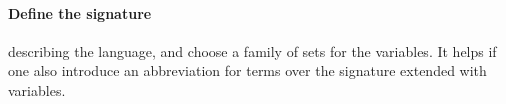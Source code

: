 \paragraph*{Define the signature}
\label{sec:define-signature} describing the language, and choose
  a family of sets for the variables. It helps if one also introduce
  an abbreviation for terms over the signature extended with
  variables.

  \begin{code}
    \>[0]\AgdaSpace{}%
\AgdaSpace{}%
\AgdaSymbol{:}\AgdaSpace{}%
\AgdaSpace{}%
\AgdaSpace{}%
\AgdaSpace{}%
\AgdaSpace{}%
\AgdaSpace{}%
\AgdaSpace{}%
\<%
\\
\>[0][@{}l@{\AgdaIndent{0}}]%
\>[2] %
\>[7]\AgdaSymbol{:}\AgdaSpace{}%
\AgdaSpace{}%
\AgdaSymbol{(}\AgdaInductiveConstructor{[]}\AgdaSpace{}%
\AgdaSpace{}%
\AgdaSymbol{)}\<%
\\
%
\>[2]\AgdaSpace{}%
\AgdaSymbol{:}\AgdaSpace{}%
\AgdaSpace{}%
\AgdaSymbol{(}\AgdaOperator{\AgdaFunction{[}}\AgdaSpace{}%
\AgdaSpace{}%
\AgdaOperator{\AgdaFunction{]}}\AgdaSpace{}%
\AgdaSpace{}%
\AgdaSymbol{)}\<%
\\
%
\>[2] \AgdaSpace{}%
\AgdaSymbol{:}\AgdaSpace{}%
\AgdaSpace{}%
\AgdaSymbol{((}\AgdaSpace{}%
\AgdaSpace{}%
\AgdaOperator{\AgdaFunction{[}}\AgdaSpace{}%
\AgdaSpace{}%
\AgdaOperator{\AgdaFunction{]}}\AgdaSymbol{)}\AgdaSpace{}%
\AgdaSpace{}%
\AgdaSymbol{)}\<%
\\
%
\\[\AgdaEmptyExtraSkip]%
\>[0]\AgdaSpace{}%
\AgdaSymbol{:}\AgdaSpace{}%
\<%
\\
\>[0]\AgdaSpace{}%
\AgdaSymbol{=}\AgdaSpace{}%
\AgdaSpace{}%
\AgdaSymbol{\{}\AgdaSpace{}%
\AgdaSpace{}%
\AgdaSymbol{=}\AgdaSpace{}%
\AgdaSpace{}%

\end{code}
